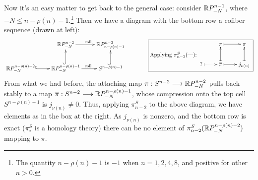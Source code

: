 Now it's an easy matter to get back to the general case: consider $\mathbb{R} P^{n-1}_{-N}$, where $-N \leq n - \rho(n) - 1$.\footnote{The quantity $n - \rho(n) - 1$ is $-1$ when $n=1,2,4,8$, and positive for other $n>0$.}   Then we have a diagram with the bottom row a cofiber sequence (drawn at left):
\[\xymatrix{
&\RP^{n-2}_{-N}\ar[r]^{\text{coll}}&\RP^{n-2}_{n-\rho(n)-1}\\
\RP^{n-\rho(n)-2}_{-N}\ar@{^{(}->}[r]&\RP^{n-\rho(n)-1}_{-N}\ar[r]^{\text{coll}}\ar@{^{(}->}[u]&S^{n-\rho(n)-1}\ar@{^{(}->}[u]
}
\qquad\qquad\raisebox{-.7cm}{\fbox{\begin{minipage}{6.5cm}\raisebox{-.7cm}{Applying $\pi_{n-2}^S(\text{---})$:} $\xymatrix{
&\pi\ar@{|->}[r]&\pi\\
?\ar@{|..>}[r]&\overline\pi\ar@{|->}[r]\ar@{|->}[u]&j_{\nu(n)}\ar@{|->}[u]
}$\end{minipage}}}\]
From what we had before, the attaching map $\pi:S^{n-2}\longrightarrow\mathbb{R} P^{n-2}_{-N}$ pulls back stably to a map $\overline\pi:S^{n-2}\longrightarrow\mathbb{R} P^{n-\rho(n)-1}_{-N}$, whose compression onto the top cell $S^{n-\rho(n)-1}$ is $j_{\nu(n)}\neq0$. Thus, applying $\pi_{n-2}^S$ to the above diagram, we have elements as in the box at the right. As $j_{\nu(n)}$ is nonzero, and the bottom row is exact ($\pi_*^S$ is a homology theory) there can be no element of $\pi_{n-2}^S(\mathbb{R} P^{n-\rho(n)-2}_{-N})$ mapping to $\overline \pi$.

